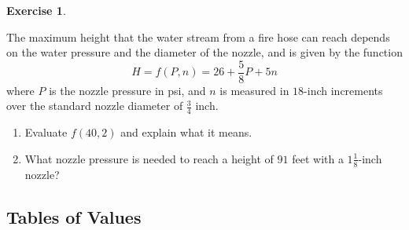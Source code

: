 \documentclass[10pt,]{book}
\theoremstyle{plain}
\theoremstyle{definition}
\theoremstyle{definition}
\theoremstyle{definition}
\theoremstyle{definition}
\theoremstyle{definition}
\newtheorem{exercise}[theorem]{Exercise}
\numberwithin{equation}{section}
\begin{document}
\begin{exercise}\label{exercise-water-stream}

    The maximum height that the water stream from a fire hose can reach depends on the water pressure and the diameter of the nozzle, and is given by the function
    \begin{equation*}H = f (P, n) = 26 + \frac{5}{8}P + 5n\end{equation*}
    where \(P\) is the nozzle pressure in psi, and \(n\) is measured in \(18\)-inch increments over the standard nozzle diameter of \(\frac{3}{4}\) inch.
    \leavevmode%
\begin{enumerate}[label=*\alph**]
\item\hypertarget{li-564}{}Evaluate \(f (40, 2)\) and explain what it means.\item\hypertarget{li-565}{}What nozzle pressure is needed to reach a height of \(91\) feet with a \(1\frac{1}{8}\)-inch nozzle?\end{enumerate}

%
\end{exercise}
\typeout{************************************************}
\typeout{************************************************}
\subsection[Tables of Values]{Tables of Values}\label{subsection-82}
\end{document}
